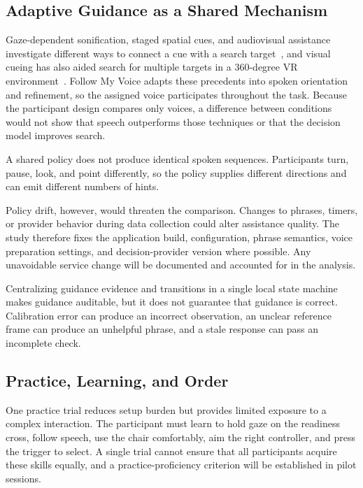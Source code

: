 \subsection{Adaptive Guidance as a Shared Mechanism}
Gaze-dependent sonification, staged spatial cues, and audiovisual assistance investigate different ways to connect a cue with a search target~\cite{losing2014guiding,kwok2022twostep,binetti2021outofview,tanaka2026coarse}, and visual cueing has also aided search for multiple targets in a 360-degree VR environment~\cite{kelley2025cueing}. Follow My Voice adapts these precedents into spoken orientation and refinement, so the assigned voice participates throughout the task. Because the participant design compares only voices, a difference between conditions would not show that speech outperforms those techniques or that the decision model improves search.

A shared policy does not produce identical spoken sequences. Participants turn, pause, look, and point differently, so the policy supplies different directions and can emit different numbers of hints.

Policy drift, however, would threaten the comparison. Changes to phrases, timers, or provider behavior during data collection could alter assistance quality. The study therefore fixes the application build, configuration, phrase semantics, voice preparation settings, and decision-provider version where possible. Any unavoidable service change will be documented and accounted for in the analysis.

Centralizing guidance evidence and transitions in a single local state machine makes guidance auditable, but it does not guarantee that guidance is correct. Calibration error can produce an incorrect observation, an unclear reference frame can produce an unhelpful phrase, and a stale response can pass an incomplete check.

\subsection{Practice, Learning, and Order}
One practice trial reduces setup burden but provides limited exposure to a complex interaction. The participant must learn to hold gaze on the readiness cross, follow speech, use the chair comfortably, aim the right controller, and press the trigger to select. A single trial cannot ensure that all participants acquire these skills equally, and a practice-proficiency criterion will be established in pilot sessions.

